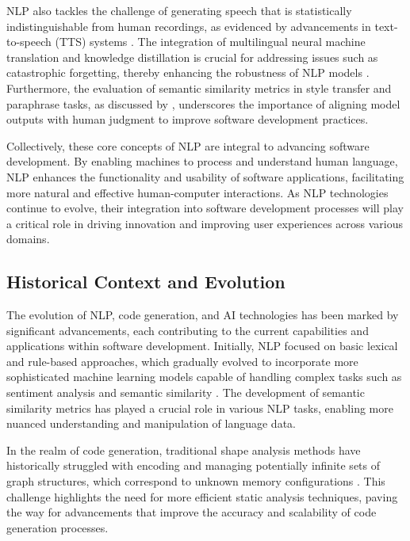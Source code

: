 NLP also tackles the challenge of generating speech that is statistically indistinguishable from human recordings, as evidenced by advancements in text-to-speech (TTS) systems \cite{tan2022naturalspeechendtoendtextspeech}. The integration of multilingual neural machine translation and knowledge distillation is crucial for addressing issues such as catastrophic forgetting, thereby enhancing the robustness of NLP models \cite{zhao2022lifelonglearningmultilingualneural}. Furthermore, the evaluation of semantic similarity metrics in style transfer and paraphrase tasks, as discussed by \cite{yamshchikov2020styletransferparaphraselookingsensible}, underscores the importance of aligning model outputs with human judgment to improve software development practices.



Collectively, these core concepts of NLP are integral to advancing software development. By enabling machines to process and understand human language, NLP enhances the functionality and usability of software applications, facilitating more natural and effective human-computer interactions. As NLP technologies continue to evolve, their integration into software development processes will play a critical role in driving innovation and improving user experiences across various domains.



\subsection{Historical Context and Evolution} \label{subsec:Historical Context and Evolution}

The evolution of NLP, code generation, and AI technologies has been marked by significant advancements, each contributing to the current capabilities and applications within software development. Initially, NLP focused on basic lexical and rule-based approaches, which gradually evolved to incorporate more sophisticated machine learning models capable of handling complex tasks such as sentiment analysis and semantic similarity \cite{yamshchikov2020styletransferparaphraselookingsensible}. The development of semantic similarity metrics has played a crucial role in various NLP tasks, enabling more nuanced understanding and manipulation of language data.



In the realm of code generation, traditional shape analysis methods have historically struggled with encoding and managing potentially infinite sets of graph structures, which correspond to unknown memory configurations \cite{holk2022lowlevelbiabduction}. This challenge highlights the need for more efficient static analysis techniques, paving the way for advancements that improve the accuracy and scalability of code generation processes.



